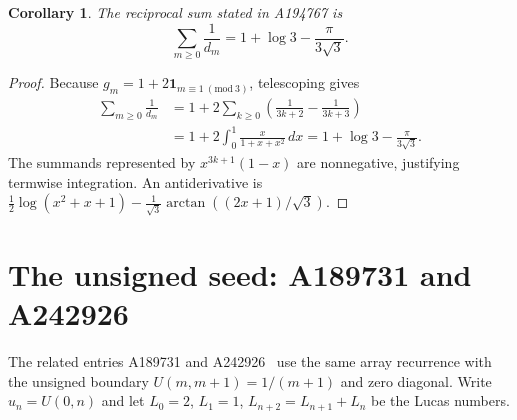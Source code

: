 \documentclass[11pt]{article}
\newtheorem{corollary}[theorem]{Corollary}
\begin{document}
\begin{corollary}\label{cor:reciprocals}
The reciprocal sum stated in A194767 is
\[
 \sum_{m\ge0}\frac1{d_m}=1+\log3-\frac{\pi}{3\sqrt3}.
\]
\end{corollary}
\begin{proof}
Because $g_m=1+2\mathbf1_{m\equiv1\ (\mathrm{mod}\ 3)}$, telescoping gives
\begin{align*}
 \sum_{m\ge0}\frac1{d_m}
 &=1+2\sum_{k\ge0}\left(\frac1{3k+2}-\frac1{3k+3}\right)\\
 &=1+2\int_0^1\frac{x}{1+x+x^2}\,dx
 =1+\log3-\frac{\pi}{3\sqrt3}.
\end{align*}
The summands represented by $x^{3k+1}(1-x)$ are nonnegative, justifying
termwise integration. An antiderivative is
$\tfrac12\log(x^2+x+1)-\tfrac1{\sqrt3}\arctan((2x+1)/\sqrt3)$.
\end{proof}

\section{The unsigned seed: A189731 and A242926}
The related entries A189731 and A242926~\cite{unsigned} use the same array
recurrence with the unsigned boundary $U(m,m+1)=1/(m+1)$ and zero diagonal.
Write $u_n=U(0,n)$ and let $L_0=2$, $L_1=1$, $L_{n+2}=L_{n+1}+L_n$
be the Lucas numbers.
\end{document}
